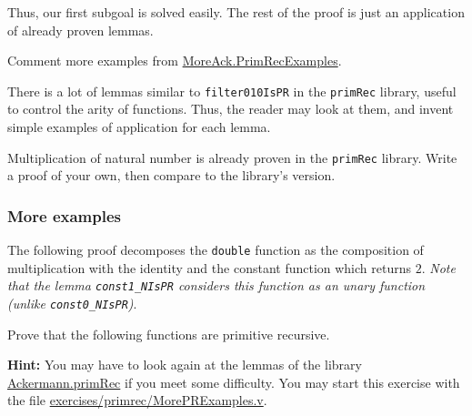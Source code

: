 \vspace{4pt}

\vspace{4pt}


Thus, our first subgoal is solved easily. The rest of the proof 
is just an application of already proven lemmas.

\vspace{4pt}




\begin{todo}
Comment more examples from   \href{../theories/html/hydras.MoreAck.PrimRecExamples.html}{MoreAck.PrimRecExamples}.
\end{todo}

\begin{exercise}
There is a lot of lemmas similar to \texttt{filter010IsPR} in the \texttt{primRec} library, useful to control the arity of functions.
Thus, the reader may look at them, and invent simple examples of application for each lemma.
\end{exercise}

\begin{exercise}
Multiplication of natural number is already proven in the \texttt{primRec} library. Write a proof of your own, then compare to the library's version.
\end{exercise}

%

\subsubsection{More examples}

The following proof decomposes the \texttt{double} function as the composition of 
multiplication with the identity and the constant function which returns $2$.
\emph{Note that the lemma \texttt{const1\_NIsPR} considers this function as an unary function (unlike \texttt{const0\_NIsPR})}. 




\begin{exercise}
Prove that the following functions are primitive recursive. 








\textbf{Hint:} You may have to look again at the lemmas of the library
\href{../theories/html/hydras.Ackermann.primRec.html}{Ackermann.primRec} if you meet some difficulty.
You may start this exercise with the file
    \href{https://github.com/coq-community/hydra-battles/blob/master/exercises/primrec/MorePRExamples.v}{exercises/primrec/MorePRExamples.v}.
\end{exercise}



